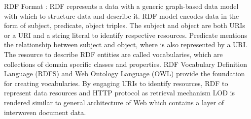 RDF Format : RDF represents a data with a generic graph-based data model\cite{linkeddatasofar} with which to structure data and describe it. RDF model encodes data in the form of subject, predicate, object triples. The subject and object are both URIs or a URI and a string literal to identify respective resources. Predicate mentions the relationship between subject and object, where is also represented by a URI. The resource to describe RDF entities are called vocabularies, which are collections of domain specific classes and properties. RDF Vocabulary Definition Language (RDFS) \cite{rdfsdefinition} and Web Ontology Language (OWL) \cite{owldefinition}  provide the foundation for creating vocabularies. By engaging URIs to identify resources, RDF to represent data resources and HTTP protocol as retrieval mechanism LOD is rendered similar to general architecture of Web which contains a layer of interwoven document data. 

